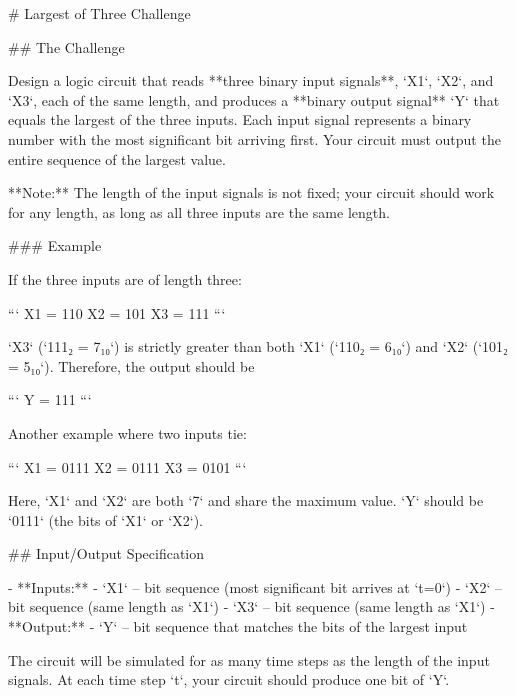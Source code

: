 # Largest of Three Challenge

## The Challenge

Design a logic circuit that reads **three binary input signals**, `X1`, `X2`, and `X3`, each of the same length, and produces a **binary output signal** `Y` that equals the largest of the three inputs. Each input signal represents a binary number with the most significant bit arriving first. Your circuit must output the entire sequence of the largest value.

**Note:** The length of the input signals is not fixed; your circuit should work for any length, as long as all three inputs are the same length.

### Example

If the three inputs are of length three:

```
X1 = 110
X2 = 101
X3 = 111
```

`X3` (`111₂ = 7₁₀`) is strictly greater than both `X1` (`110₂ = 6₁₀`) and `X2` (`101₂ = 5₁₀`). Therefore, the output should be

```
Y  = 111
```

Another example where two inputs tie:

```
X1 = 0111
X2 = 0111
X3 = 0101
```

Here, `X1` and `X2` are both `7` and share the maximum value. `Y` should be `0111` (the bits of `X1` or `X2`).

## Input/Output Specification

- **Inputs:**
  - `X1` – bit sequence (most significant bit arrives at `t=0`)
  - `X2` – bit sequence (same length as `X1`)
  - `X3` – bit sequence (same length as `X1`)
- **Output:**
  - `Y` – bit sequence that matches the bits of the largest input

The circuit will be simulated for as many time steps as the length of the input signals. At each time step `t`, your circuit should produce one bit of `Y`.